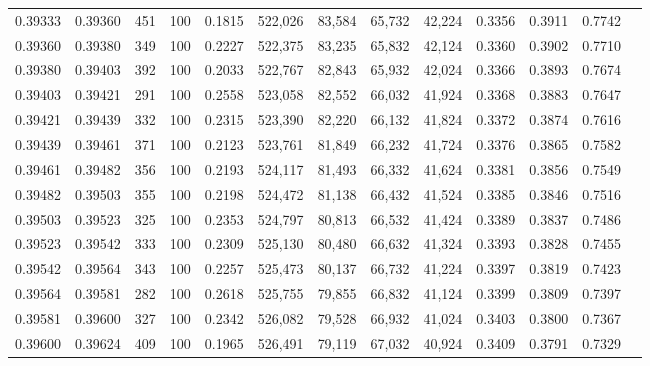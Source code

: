 \begin{tabular}{rrrrrrrrrrrrr}
0.39333 & 0.39360 &   451 & 100 &                                     0.1815 & 522,026 &  83,584 &  65,732 &  42,224 & 0.3356 & 0.3911 & 0.7742 \\
0.39360 & 0.39380 &   349 & 100 &                                     0.2227 & 522,375 &  83,235 &  65,832 &  42,124 & 0.3360 & 0.3902 & 0.7710 \\
0.39380 & 0.39403 &   392 & 100 &                                     0.2033 & 522,767 &  82,843 &  65,932 &  42,024 & 0.3366 & 0.3893 & 0.7674 \\
0.39403 & 0.39421 &   291 & 100 &                                     0.2558 & 523,058 &  82,552 &  66,032 &  41,924 & 0.3368 & 0.3883 & 0.7647 \\
0.39421 & 0.39439 &   332 & 100 &                                     0.2315 & 523,390 &  82,220 &  66,132 &  41,824 & 0.3372 & 0.3874 & 0.7616 \\
0.39439 & 0.39461 &   371 & 100 &                                     0.2123 & 523,761 &  81,849 &  66,232 &  41,724 & 0.3376 & 0.3865 & 0.7582 \\
0.39461 & 0.39482 &   356 & 100 &                                     0.2193 & 524,117 &  81,493 &  66,332 &  41,624 & 0.3381 & 0.3856 & 0.7549 \\
0.39482 & 0.39503 &   355 & 100 &                                     0.2198 & 524,472 &  81,138 &  66,432 &  41,524 & 0.3385 & 0.3846 & 0.7516 \\
0.39503 & 0.39523 &   325 & 100 &                                     0.2353 & 524,797 &  80,813 &  66,532 &  41,424 & 0.3389 & 0.3837 & 0.7486 \\
0.39523 & 0.39542 &   333 & 100 &                                     0.2309 & 525,130 &  80,480 &  66,632 &  41,324 & 0.3393 & 0.3828 & 0.7455 \\
0.39542 & 0.39564 &   343 & 100 &                                     0.2257 & 525,473 &  80,137 &  66,732 &  41,224 & 0.3397 & 0.3819 & 0.7423 \\
0.39564 & 0.39581 &   282 & 100 &                                     0.2618 & 525,755 &  79,855 &  66,832 &  41,124 & 0.3399 & 0.3809 & 0.7397 \\
0.39581 & 0.39600 &   327 & 100 &                                     0.2342 & 526,082 &  79,528 &  66,932 &  41,024 & 0.3403 & 0.3800 & 0.7367 \\
0.39600 & 0.39624 &   409 & 100 &                                     0.1965 & 526,491 &  79,119 &  67,032 &  40,924 & 0.3409 & 0.3791 & 0.7329 \\

\end{tabular}
